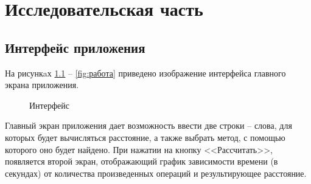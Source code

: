 \chapter{Исследовательская часть}

\section{Интерфейс приложения}

На рисункaх  \ref{fig:интерфейс} -- \ref{fig:работа} приведено изображение интерфейса главного экрана приложения.

\begin{figure}[h!]
	\caption{Интерфейс}
	\label{fig:интерфейс}
\end{figure}


Главный экран приложения дает возможность ввести две строки -- слова, для которых будет вычисляться расстояние, а также выбрать метод, с помощью которого оно будет найдено. При нажатии на кнопку <<Рассчитать>>, появляется второй экран, отображающий график зависимости времени (в секундах) от количества произведенных операций и результирующее расстояние.

